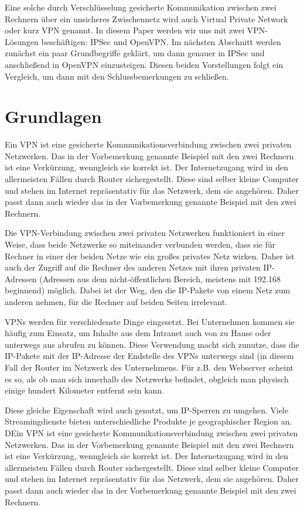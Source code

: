 \documentclass[12pt]{scrartcl}
\begin{document}
Eine solche durch Verschlüsselung gesicherte Kommunikation zwischen zwei Rechnern über ein unsicheres Zwischennetz wird auch Virtual Private Network oder kurz VPN genannt. In diesem Paper werden wir uns mit zwei VPN-Lösungen beschäftigen: IPSec und OpenVPN. Im nächsten Abschnitt werden zunächst ein paar Grundbegriffe geklärt, um dann genauer in IPSec und anschließend in OpenVPN einzusteigen. Diesen beiden Vorstellungen folgt ein Vergleich, um dann mit den Schlussbemerkungen zu schließen.

\section{Grundlagen}
Ein VPN ist eine gesicherte Kommunikationsverbindung zwischen zwei privaten Netzwerken. Das in der Vorbemerkung genannte Beispiel mit den zwei Rechnern ist eine Verkürzung, wenngleich sie korrekt ist. Der Internetzugang wird in den allermeisten Fällen durch Router sichergestellt. Diese sind selber kleine Computer und stehen im Internet repräsentativ für das Netzwerk, dem sie angehören. Daher passt dann auch wieder das in der Vorbemerkung genannte Beispiel mit den zwei Rechnern. 

Die VPN-Verbindung zwischen zwei privaten Netzwerken funktioniert in einer Weise, dass beide Netzwerke so miteinander verbunden werden, dass sie für Rechner in einer der beiden Netze wie ein großes privates Netz wirken. Daher ist auch der Zugriff auf die Rechner des anderen Netzes mit ihren privaten IP-Adressen (Adressen aus dem nicht-öffentlichen Bereich, meistens mit 192.168 beginnend) möglich. Dabei ist der Weg, den die IP-Pakete von einem Netz zum anderen nehmen, für die Rechner auf beiden Seiten irrelevant.

VPNs werden für verschiedenste Dinge eingesetzt. Bei Unternehmen kommen sie häufig zum Einsatz, um Inhalte aus dem Intranet auch von zu Hause oder unterwegs aus abrufen zu können. Diese Verwendung macht sich zunutze, dass die IP-Pakete mit der IP-Adresse der Endstelle des VPNs unterwegs sind (in diesem Fall der Router im Netzwerk des Unternehmens. Für z.B. den Webserver scheint es so, als ob man sich innerhalb des Netzwerks befindet, obgleich man physisch einige hundert Kilometer entfernt sein kann.

Diese gleiche Eigenschaft wird auch genutzt, um IP-Sperren zu umgehen. Viele Streamingdienste bieten unterschiedliche Produkte je geographischer Region an. DEin VPN ist eine gesicherte Kommunikationsverbindung zwischen zwei privaten Netzwerken. Das in der Vorbemerkung genannte Beispiel mit den zwei Rechnern ist eine Verkürzung, wenngleich sie korrekt ist. Der Internetzugang wird in den allermeisten Fällen durch Router sichergestellt. Diese sind selber kleine Computer und stehen im Internet repräsentativ für das Netzwerk, dem sie angehören. Daher passt dann auch wieder das in der Vorbemerkung genannte Beispiel mit den zwei Rechnern. 
\end{document}
